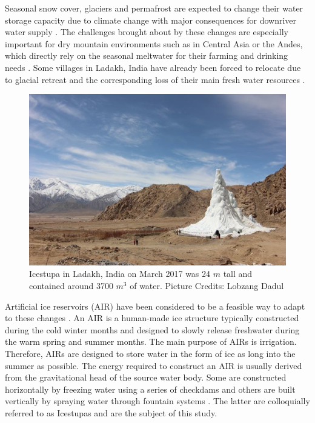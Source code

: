 \documentclass[utf8]{frontiersSCNS} %
\begin{document}
Seasonal snow cover, glaciers and permafrost are expected to change their water storage capacity due to climate
change with major consequences for downriver water supply \citep{Immerzeel_2020}. The challenges brought about by
these changes are especially important for dry mountain environments such as in Central Asia or the Andes, which
directly rely on the seasonal meltwater for their farming and drinking needs \citep{HoelzleBarandun_2019,
	Apel_2018, Buytaert_2017, Chen_2016, UNGERSHAYESTEH_2013}. Some villages in Ladakh, India have already been forced
to relocate due to glacial retreat and the corresponding loss of their main fresh water resources \citep{zanskar}.

\begin{figure}
	\begin{center}
		\includegraphics[width=10 cm]{Figures/Figure_1.jpg}
	\end{center}
	\caption{Icestupa in Ladakh, India on March 2017 was 24 $m$ tall and contained around 3700 $m^3$
		of water. Picture Credits: Lobzang Dadul}
	\label{fig:old_icestupa}
\end{figure}

Artificial ice reservoirs (AIR) have been considered to be a feasible way to adapt to these changes
\citep{IPCC_2019,10.1659/MRD-JOURNAL-D-18-00072.1}. An AIR is a human-made ice structure typically constructed
during the cold winter months and designed to slowly release freshwater during the warm spring and summer months.
The main purpose of AIRs is irrigation. Therefore, AIRs are designed to store water in the form of ice as long into
the summer as possible. The energy required to construct an AIR is usually derived from the gravitational head of
the source water body. Some are constructed horizontally by freezing water using a series of checkdams and others
are built vertically by spraying water through fountain systems \citep{Nusser_2018}. The latter are colloquially
referred to as Icestupas and are the subject of this study.
\end{document}
